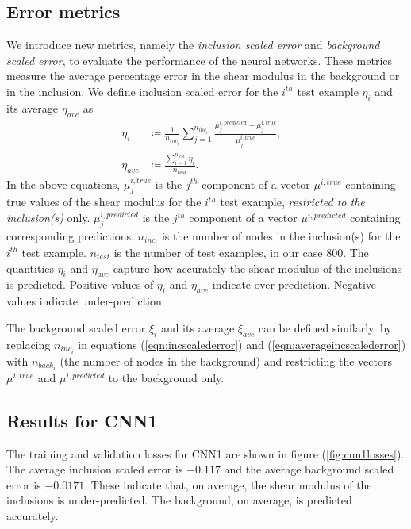 \documentclass[12pt]{article}
\begin{document}
\subsection{Error metrics}
We introduce new metrics, namely the \textit{inclusion scaled error} and \textit{background scaled error}, to evaluate the performance of the neural networks. These metrics  measure the average percentage error in the shear modulus in the background or in the inclusion. We define inclusion scaled error for the $i^{th}$ test example $\eta_{i}$ and its average $\eta_{ave}$ as
\begin{subequations}
  \begin{align}
  \eta_{i} &\coloneqq \frac{1}{n_{inc_i}}\sum_{j=1}^{n_{inc_i}}\frac{\mu^{i,predicted}_{j}-\mu^{i,true}_{j}}{\mu^{i,true}_{j}},  &\label{eqn:incscalederror}\\
  \eta_{ave} &\coloneqq \frac{\sum_{i=1}^{n_{test}}\eta_{i}}{n_{test}}. &\label{eqn:averageincscalederror}
  \end{align}
\end{subequations}
In the above equations, $\mu_{j}^{i,true}$ is the $j^{th}$ component of a vector $\mu^{i,true}$ containing true values of the shear modulus for the $i^{th}$ test example, \textit{restricted to the inclusion(s)} only. $\mu_{j}^{i,predicted}$ is the $j^{th}$ component of a vector $\mu^{i,predicted}$ containing corresponding predictions. $n_{inc_i}$ is the number of nodes in the inclusion(s) for the $i^{th}$ test example. $n_{test}$ is the number of test examples, in our case $800$. The quantities $\eta_i$ and $\eta_{ave}$ capture how accurately the shear modulus of the inclusions is predicted. Positive values of $\eta_i$ and $\eta_{ave}$ indicate over-prediction. Negative values indicate under-prediction.

The background scaled error $\xi_{i}$ and its average $\xi_{ave}$ can be defined similarly, by replacing $n_{inc_i}$ in equations (\ref{eqn:incscalederror}) and (\ref{eqn:averageincscalederror})  with $n_{back_i}$ (the number of nodes in the background) and restricting the vectors $\mu^{i,true}$ and $\mu^{i,predicted}$ to the background only.
%
\subsection{\label{sect:resultscnn1}Results for CNN1}
%
The training and validation losses for CNN1 are shown in figure (\ref{fig:cnn1losses}). The average inclusion scaled error is $-0.117$ and the average background scaled error is $-0.0171$. These indicate that, on average, the shear modulus of the inclusions is under-predicted. The background, on average, is predicted accurately.
\end{document}

